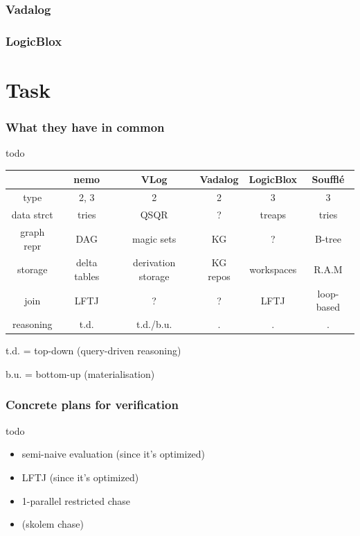 \documentclass[aspectratio=169]{beamer}
\begin{document}
\begin{frame}
	\frametitle{Vadalog}
	\begin{center}
	
	\end{center}
\end{frame}

\begin{frame}
	\frametitle{LogicBlox}
	\begin{center}
	
	\end{center}
\end{frame}


\section{Task}

\begin{frame}
	\frametitle{What they have in common}
		todo
	
		\begin{tabular}{|c||c|c|c|c|c|} 
		 \hline
		  & nemo & VLog & Vadalog & LogicBlox & Soufflé \\
		 \hline\hline
		 type & 2, 3 & 2 & 2 & 3 & 3 \\ 
		 \hline
		 data strct & tries & QSQR & ? & treaps & tries \\
		 \hline
		 graph repr & DAG & magic sets & KG & ? & B-tree \\
		 \hline
		 storage & delta tables & derivation storage & KG repos & workspaces & R.A.M \\
		 \hline
		 join & LFTJ & ? & ? & LFTJ & loop-based \\
		 \hline
		 reasoning & t.d. & t.d./b.u. & . & . & . \\
		 \hline
		\end{tabular}
		
		\vspace{1em}
		t.d. = top-down (query-driven reasoning)
		
		b.u. = bottom-up (materialisation)

\end{frame}

\begin{frame}
	\frametitle{Concrete plans for verification}
	todo
	\begin{itemize}
		\item semi-naive evaluation (since it's optimized)
		\item LFTJ (since it's optimized)
		\item 1-parallel restricted chase
		\item (skolem chase)
	\end{itemize}
\end{frame}
\end{document}
